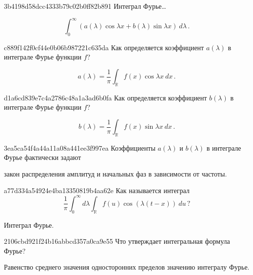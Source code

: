 \begin{note}{3b4198d58dcc4333b79c02b0ff82b891}
    Интеграл Фурье\ldots

    \begin{cloze}{1}
        \[
            \int_{0}^{\infty} (a(\lambda) \cos \lambda x + b(\lambda) \sin \lambda x)\: d\lambda\,.
        \]
    \end{cloze}
\end{note}

\begin{note}{c889f142f0cf44e0b06b987221c635da}
    Как определяется коэффициент \({ a(\lambda) }\) в интеграле Фурье функции \({ f }\)?

    \begin{cloze}{1}
        \[
            a(\lambda) = \frac{1}{\pi} \int_{\mathbb R} f(x) \cos \lambda x\: dx\,.
        \]
    \end{cloze}
\end{note}

\begin{note}{d1a6cd839e7c4a2786c48a1a3ad6b0fa}
    Как определяется коэффициент \({ b(\lambda) }\) в интеграле Фурье функции \({ f }\)?

    \begin{cloze}{1}
        \[
            b(\lambda) = \frac{1}{\pi} \int_{\mathbb R} f(x) \sin \lambda x\: dx\,.
        \]
    \end{cloze}
\end{note}

\begin{note}{3ea5ca54f4a44a11a08a441ee3f997ea}
    Коэффициенты \({ a(\lambda) }\) и \({ b(\lambda) }\) в интеграле Фурье фактически задают \begin{icloze}{1}закон распределения амплитуд и начальных фаз в зависимости от частоты.\end{icloze}
\end{note}

\begin{note}{a77d334a54924e4ba13350819b4aa62e}
    Как называется интеграл
    \[
        \frac{1}{\pi} \int_{0}^{\infty} d\lambda \int_{\mathbb R} f(u) \cos (\lambda(t-x))\: du\,?
    \]

    \begin{cloze}{1}
        Интеграл Фурье.
    \end{cloze}
\end{note}

\begin{note}{2106cbd921f24b16abbcd357a0ca9e55}
    Что утверждает интегральная формула Фурье?

    \begin{cloze}{1}
        Равенство среднего значения односторонних пределов значению интегралу Фурье.
    \end{cloze}
\end{note}

